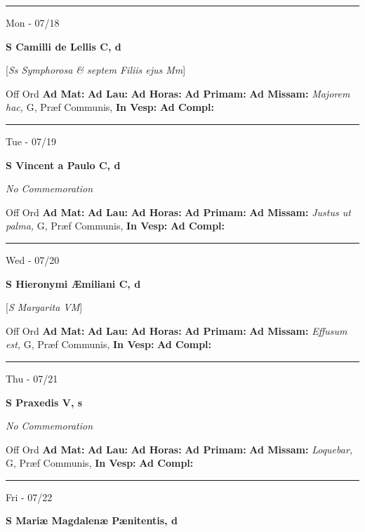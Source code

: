 \documentclass[letterpaper, 10pt]{article}
\begin{document}
\hrule
\begin{center}
Mon - 07/18
\end{center}\textbf{ \large S Camilli de Lellis C, \textnormal{\normalsize d}}

[\textit{Ss Symphorosa \& septem Filiis ejus Mm}]
\begin{justify}
Off Ord
\textbf{Ad Mat: }
\textbf{Ad Lau: }
\textbf{Ad Horas: }
\textbf{Ad Primam: }
\textbf{Ad Missam:} \textit{Majorem hac, } G, Præf Communis, 
\textbf{In Vesp: }
\textbf{Ad Compl: }\end{justify}



\hrule
\begin{center}
Tue - 07/19
\end{center}\textbf{ \large S Vincent a Paulo C, \textnormal{\normalsize d}}

\textit{No Commemoration}\begin{justify}
Off Ord
\textbf{Ad Mat: }
\textbf{Ad Lau: }
\textbf{Ad Horas: }
\textbf{Ad Primam: }
\textbf{Ad Missam:} \textit{Justus ut palma, } G, Præf Communis, 
\textbf{In Vesp: }
\textbf{Ad Compl: }\end{justify}



\hrule
\begin{center}
Wed - 07/20
\end{center}\textbf{ \large S Hieronymi Æmiliani C, \textnormal{\normalsize d}}

[\textit{S Margarita VM}]
\begin{justify}
Off Ord
\textbf{Ad Mat: }
\textbf{Ad Lau: }
\textbf{Ad Horas: }
\textbf{Ad Primam: }
\textbf{Ad Missam:} \textit{Effusum est, } G, Præf Communis, 
\textbf{In Vesp: }
\textbf{Ad Compl: }\end{justify}



\hrule
\begin{center}
Thu - 07/21
\end{center}\textbf{ \large S Praxedis V, \textnormal{\normalsize s}}

\textit{No Commemoration}\begin{justify}
Off Ord
\textbf{Ad Mat: }
\textbf{Ad Lau: }
\textbf{Ad Horas: }
\textbf{Ad Primam: }
\textbf{Ad Missam:} \textit{Loquebar, } G, Præf Communis, 
\textbf{In Vesp: }
\textbf{Ad Compl: }\end{justify}



\hrule
\begin{center}
Fri - 07/22
\end{center}\textbf{ \large S Mariæ Magdalenæ Pænitentis, \textnormal{\normalsize d}}
\end{document}
